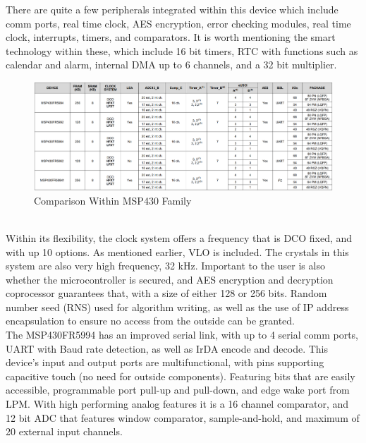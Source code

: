 \documentclass[12pt]{article}
\begin{document}
\indent
There are quite a few peripherals integrated within this device which include comm ports, real time clock, AES encryption, error checking modules, real time clock, interrupts, timers, and comparators. It is worth mentioning the smart technology within these, which include 16 bit timers, RTC with functions such as calendar and alarm, internal DMA up to 6 channels, and a 32 bit multiplier. \cite{testKit} \\
\hfill
\begin{figure}[h!]
\centering
\includegraphics[width=\linewidth]{micro_controller_device_comp}
\caption{Comparison Within MSP430 Family \cite{MSP430FR599x}}
\end{figure}
\hfill \\
\indent
Within its flexibility, the clock system offers a frequency that is DCO fixed, and with up 10 options. As mentioned earlier, VLO is included. The crystals in this system are also very high frequency, 32 kHz. Important to the user is also whether the microcontroller is secured, and AES encryption and decryption coprocessor guarantees that, with a size of either 128 or 256 bits. Random number seed (RNS) used for algorithm writing, as well as the use of IP address encapsulation to ensure no access from the outside can be granted. \cite{MSP430FR599x} \\

\indent
The MSP430FR5994 has an improved serial link, with up to 4 serial comm ports, UART with Baud rate detection, as well as IrDA encode and decode. This device’s input and output ports are multifunctional, with pins supporting capacitive touch (no need for outside components). Featuring bits that are easily accessible, programmable port pull-up and pull-down, and edge wake port from LPM. With high performing analog features it is a 16 channel comparator, and 12 bit ADC that features window comparator, sample-and-hold, and maximum of 20 external input channels. \cite{MSP430FR599x} \\
\end{document}
